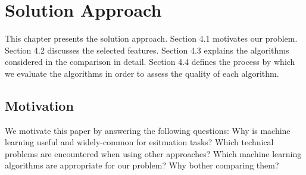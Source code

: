 

\chapter{Solution Approach}
This chapter presents the solution approach.
Section 4.1 motivates our problem. 
Section 4.2 discusses the selected features.
Section 4.3 explains the algorithms considered in the comparison in detail.
Section 4.4 defines the process by which we evaluate the algorithms in order to assess the quality of each algorithm.

\section{Motivation}

We motivate this paper by answering the following questions:
Why is machine learning useful and widely-common for esitmation tasks? 
Which technical problems are encountered when using other approaches? 
Which machine learning algorithms are appropriate for our problem? Why bother comparing them? 


